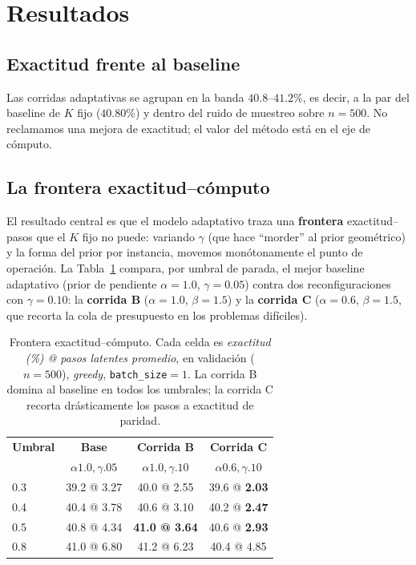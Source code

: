 \documentclass[11pt]{article}
\begin{document}
\section{Resultados}
\label{sec:resultados}

\subsection{Exactitud frente al baseline}

Las corridas adaptativas se agrupan en la banda $40.8$--$41.2\%$, es decir, a la par del baseline de $K$ fijo ($40.80\%$) y dentro del ruido de muestreo sobre $n=500$. No reclamamos una mejora de exactitud; el valor del método está en el eje de cómputo.

\subsection{La frontera exactitud--cómputo}
\label{sec:frontera}

El resultado central es que el modelo adaptativo traza una \textbf{frontera} exactitud--pasos que el $K$ fijo no puede: variando $\gamma$ (que hace ``morder'' al prior geométrico) y la forma del prior por instancia, movemos monótonamente el punto de operación. La Tabla~\ref{tab:frontera} compara, por umbral de parada, el mejor baseline adaptativo (prior de pendiente $\alpha=1.0$, $\gamma=0.05$) contra dos reconfiguraciones con $\gamma=0.10$: la \textbf{corrida B} ($\alpha=1.0$, $\beta=1.5$) y la \textbf{corrida C} ($\alpha=0.6$, $\beta=1.5$, que recorta la cola de presupuesto en los problemas difíciles).

\begin{table}[t]
  \centering
  \small
  \begin{tabular}{lccc}
    \toprule
    \textbf{Umbral} & \textbf{Base} & \textbf{Corrida B} & \textbf{Corrida C} \\
                    & $\alpha1.0,\gamma.05$ & $\alpha1.0,\gamma.10$ & $\alpha0.6,\gamma.10$ \\
    \midrule
    0.3 & 39.2 @ 3.27 & 40.0 @ 2.55 & 39.6 @ \textbf{2.03} \\
    0.4 & 40.4 @ 3.78 & 40.6 @ 3.10 & 40.2 @ \textbf{2.47} \\
    0.5 & 40.8 @ 4.34 & \textbf{41.0 @ 3.64} & 40.6 @ \textbf{2.93} \\
    0.8 & 41.0 @ 6.80 & 41.2 @ 6.23 & 40.4 @ 4.85 \\
    \bottomrule
  \end{tabular}
  \caption{Frontera exactitud--cómputo. Cada celda es \emph{exactitud (\%) @ pasos latentes promedio}, en validación ($n=500$), \textit{greedy}, \texttt{batch\_size}$=1$. La corrida B domina al baseline en todos los umbrales; la corrida C recorta drásticamente los pasos a exactitud de paridad.}
  \label{tab:frontera}
\end{table}
\end{document}
